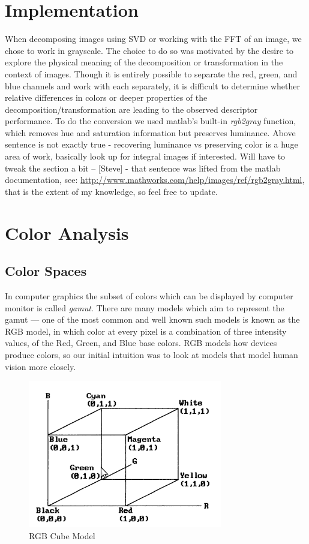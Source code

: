 \documentclass{report}
\begin{document}
\section{Implementation}

When decomposing images using SVD or working with the FFT of an image, we chose to work in grayscale. The choice to do so was motivated by the desire to explore the physical meaning of the decomposition or transformation in the context of images. Though it is entirely possible to separate the red, green, and blue channels and work with each separately, it is difficult to determine whether relative differences in colors or deeper properties of the decomposition/transformation are leading to the observed descriptor performance. To do the conversion we used matlab's built-in \textit{rgb2gray} function, which removes hue and saturation information but preserves luminance. {\color{red} Above sentence is not exactly true - recovering luminance vs preserving color is a huge area of work, basically look up for integral images if interested. Will have to tweak the section a bit -- [Steve] - that sentence was lifted from the matlab documentation, see: \url{http://www.mathworks.com/help/images/ref/rgb2gray.html}, that is the extent of my knowledge, so feel free to update.}

\section{Color Analysis}
\subsection{Color Spaces}
In computer graphics the subset of colors which can be displayed by computer monitor is called \emph{gamut}\cite{color_model_ref}. There are many models which aim to represent the gamut --- one of the most common and well known such models is known as the RGB model, in which color at every pixel is a combination of three intensity values, of the Red, Green, and Blue base colors. RGB models how devices produce colors, so our initial intuition was to look at models that model human vision more closely.  
\begin{figure}[hbtp]
\centering
\includegraphics[scale=0.5]{graphics/rgb_cube.png}
\caption{RGB Cube Model}
\end{figure}
\end{document}
